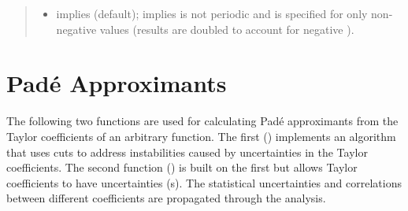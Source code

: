 \documentclass[letterpaper,10pt,english]{sphinxmanual}
\begin{document}
\begin{fulllineitems}
\begin{quote}
\begin{description}
\begin{itemize}
\item {} 
 \textendash{}  implies  (default);
 implies  is not periodic and
is specified for only non-negative  values
(results are doubled to account for negative ).

\end{itemize}

\end{description}\end{quote}

\end{fulllineitems}



\section{Padé Approximants}
\label{\detokenize{g2tools:pade-approximants}}
The following two functions are used for calculating Padé approximants from
the Taylor coefficients of an arbitrary function. The first
({\hyperref[\detokenize{g2tools:g2tools.pade_svd}]{}}) implements an algorithm that uses  cuts to
address instabilities caused  by uncertainties in the Taylor coefficients. The
second function ({\hyperref[\detokenize{g2tools:g2tools.pade_gvar}]{}}) is built on the first but allows
Taylor coefficients to have uncertainties (s). The statistical
uncertainties and correlations between different coefficients are propagated
through the analysis.
\end{document}
